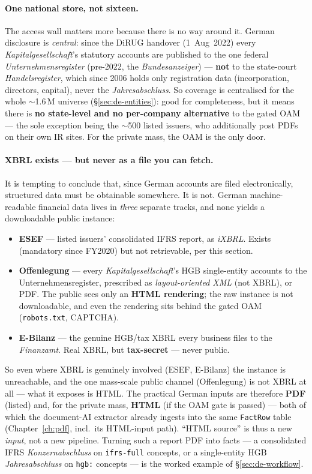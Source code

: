 \documentclass[11pt,a4paper]{report}
\begin{document}
\paragraph{One national store, not sixteen.} The access wall matters more because there is no way around
it. German disclosure is \emph{central}: since the DiRUG handover (1~Aug~2022) every
\emph{Kapitalgesellschaft}'s statutory accounts are published to the one federal \emph{Unternehmensregister}
(pre-2022, the \emph{Bundesanzeiger}) --- \textbf{not} to the state-court \emph{Handelsregister}, which since
2006 holds only registration data (incorporation, directors, capital), never the \emph{Jahresabschluss}. So
coverage is centralised for the whole $\sim$1.6\,M universe (\S\ref{sec:de-entities}): good for completeness,
but it means there is \textbf{no state-level and no per-company alternative} to the gated OAM --- the sole
exception being the $\sim$500 listed issuers, who additionally post PDFs on their own IR sites. For the
private mass, the OAM is the only door.

\paragraph{XBRL exists --- but never as a file you can fetch.} It is tempting to conclude that, since
German accounts are filed electronically, structured data must be obtainable somewhere. It is not. German
machine-readable financial data lives in \emph{three} separate tracks, and none yields a downloadable public
instance:
\begin{itemize}[leftmargin=1.4em,itemsep=1pt,topsep=2pt]
  \item \textbf{ESEF} --- listed issuers' consolidated IFRS report, as \emph{iXBRL}. Exists (mandatory since
    FY2020) but not retrievable, per this section.
  \item \textbf{Offenlegung} --- every \emph{Kapitalgesellschaft}'s HGB single-entity accounts to the
    Unternehmensregister, prescribed as \emph{layout-oriented XML} (not XBRL), or PDF. The public sees only an
    \textbf{HTML rendering}; the raw instance is not downloadable, and even the rendering sits behind the gated
    OAM (\texttt{robots.txt}, CAPTCHA).
  \item \textbf{E-Bilanz} --- the genuine HGB/tax XBRL every business files to the \emph{Finanzamt}. Real XBRL,
    but \textbf{tax-secret} --- never public.
\end{itemize}
\noindent So even where XBRL is genuinely involved (ESEF, E-Bilanz) the instance is unreachable, and the one
mass-scale public channel (Offenlegung) is not XBRL at all --- what it exposes is HTML. The practical German
inputs are therefore \textbf{PDF} (listed) and, for the private mass, \textbf{HTML} (if the OAM gate is
passed) --- both of which the document-AI extractor already ingests into the same \texttt{FactRow} table
(Chapter~\ref{ch:pdf}, incl.\ its HTML-input path). ``HTML source'' is thus a new \emph{input}, not a new
pipeline. Turning such a report PDF into facts --- a consolidated IFRS \emph{Konzernabschluss} on
\texttt{ifrs-full} concepts, or a single-entity HGB \emph{Jahresabschluss} on \texttt{hgb:} concepts --- is
the worked example of \S\ref{sec:de-workflow}.
\end{document}
